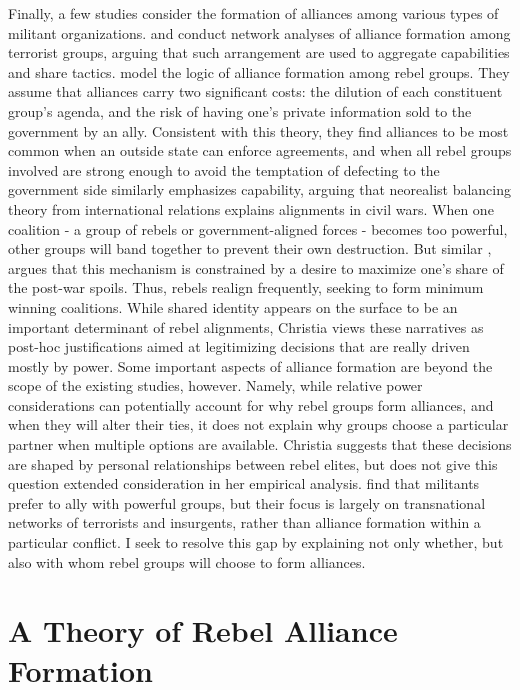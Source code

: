 \documentclass[12pt,]{book}
\begin{document}
Finally, a few studies consider the formation of alliances among various
types of militant organizations. \citet{Asal2008} and
\citet{Horowitz2013} conduct network analyses of alliance formation
among terrorist groups, arguing that such arrangement are used to
aggregate capabilities and share tactics. \citet{Bapat2012} model the
logic of alliance formation among rebel groups. They assume that
alliances carry two significant costs: the dilution of each constituent
group's agenda, and the risk of having one's private information sold to
the government by an ally. Consistent with this theory, they find
alliances to be most common when an outside state can enforce
agreements, and when all rebel groups involved are strong enough to
avoid the temptation of defecting to the government side
\citet{Christia2012} similarly emphasizes capability, arguing that
neorealist balancing theory from international relations explains
alignments in civil wars. When one coalition - a group of rebels or
government-aligned forces - becomes too powerful, other groups will band
together to prevent their own destruction. But similar
\citet{Bapat2012}, \citet{Christia2012} argues that this mechanism is
constrained by a desire to maximize one's share of the post-war spoils.
Thus, rebels realign frequently, seeking to form minimum winning
coalitions. While shared identity appears on the surface to be an
important determinant of rebel alignments, Christia views these
narratives as post-hoc justifications aimed at legitimizing decisions
that are really driven mostly by power. Some important aspects of
alliance formation are beyond the scope of the existing studies,
however. Namely, while relative power considerations can potentially
account for why rebel groups form alliances, and when they will alter
their ties, it does not explain why groups choose a particular partner
when multiple options are available. Christia suggests that these
decisions are shaped by personal relationships between rebel elites, but
does not give this question extended consideration in her empirical
analysis. \citet{Horowitz2013} find that militants prefer to ally with
powerful groups, but their focus is largely on transnational networks of
terrorists and insurgents, rather than alliance formation within a
particular conflict. I seek to resolve this gap by explaining not only
whether, but also with whom rebel groups will choose to form alliances.

\section{A Theory of Rebel Alliance
Formation}\label{a-theory-of-rebel-alliance-formation}
\end{document}
